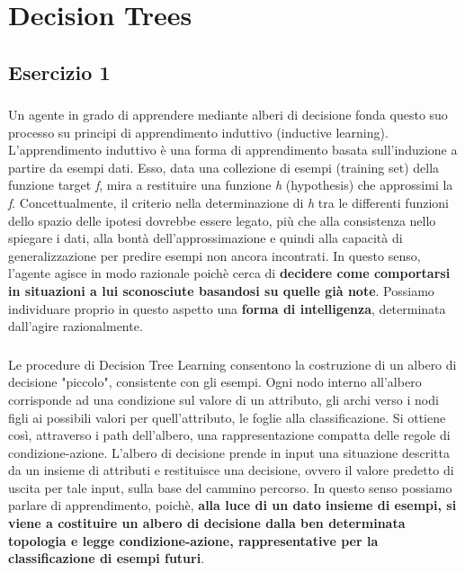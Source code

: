 \chapter{Decision Trees}
	\label{ch:dt}
	\section{Esercizio 1}
		\label{sec:es1}
		\subsection{}
		\subsection{}
			Un agente in grado di apprendere mediante alberi di decisione fonda questo suo processo su principi di apprendimento induttivo (\textsf{inductive learning}). L'apprendimento induttivo è una forma di apprendimento basata sull'induzione a partire da esempi dati. Esso, data una collezione di esempi (\textsf{training set}) della funzione \textsf{target} \emph{f}, mira a restituire una funzione \emph{h} (\textsf{hypothesis}) che approssimi la \emph{f}. Concettualmente, il criterio nella determinazione di \emph{h} tra le differenti funzioni dello spazio delle ipotesi dovrebbe essere legato, più che alla consistenza nello spiegare i dati, alla bontà dell'approssimazione e quindi alla capacità di generalizzazione per predire esempi non ancora incontrati. In questo senso, l'agente agisce in modo razionale poichè cerca di \textbf{decidere come comportarsi in situazioni a lui sconosciute basandosi su quelle già note}. Possiamo individuare proprio in questo aspetto una \textbf{forma di intelligenza}, determinata dall'agire razionalmente.
		\subsection{}
			Le procedure di \textsf{Decision Tree Learning} consentono la costruzione di un albero di decisione "piccolo", consistente con gli esempi. Ogni nodo interno all'albero corrisponde ad una condizione sul valore di un attributo, gli archi verso i nodi figli ai possibili valori per quell'attributo, le foglie alla classificazione. Si ottiene così, attraverso i \textsf{path} dell'albero, una rappresentazione compatta delle regole di condizione-azione. L'albero di decisione prende in input una situazione descritta da un insieme di attributi e restituisce una decisione, ovvero il valore predetto di uscita per tale input, sulla base del cammino percorso. In questo senso possiamo parlare di apprendimento, poichè, \textbf{alla luce di un dato insieme di esempi, si viene a costituire un albero di decisione dalla ben determinata topologia e legge condizione-azione, rappresentative per la classificazione di esempi futuri}.
